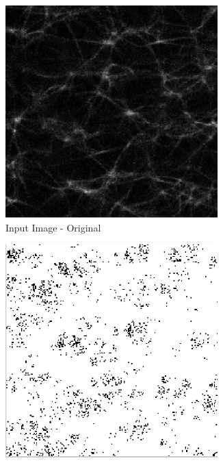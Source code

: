\begin{figure}[!htb]
\begin{subfigure}{0.5\textwidth}
  \centering
  \includegraphics[width=0.9\textwidth]{Figures/chapter-image/binary/fig_bin_original.png}%
  \caption{Input Image - Original}
  \label{binoriginal}
\end{subfigure}%
\begin{minipage}{0.5\textwidth}
  \centering
  \begin{subfigure}{0.5\textwidth}
    \centering
    \includegraphics[width=0.9\textwidth]{Figures/chapter-image/binary/fig_bin_01.png}%

\end{subfigure}
\end{minipage}
\end{figure}
